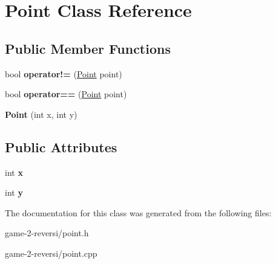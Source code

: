 \hypertarget{classPoint}{\section{Point Class Reference}
\label{classPoint}
}
\subsection*{Public Member Functions}
\begin{DoxyCompactItemize}
\item 
\hypertarget{classPoint_adcee15014d4b11143ecfc9afffe6a338}{bool {\bfseries operator!=} (\hyperlink{classPoint}{Point} point)}\label{classPoint_adcee15014d4b11143ecfc9afffe6a338}

\item 
\hypertarget{classPoint_ab5e7dc8e63dae82bc88456125b957482}{bool {\bfseries operator==} (\hyperlink{classPoint}{Point} point)}\label{classPoint_ab5e7dc8e63dae82bc88456125b957482}

\item 
\hypertarget{classPoint_a001c4958c310b248f5c26037aea38a9c}{{\bfseries Point} (int x, int y)}\label{classPoint_a001c4958c310b248f5c26037aea38a9c}

\end{DoxyCompactItemize}
\subsection*{Public Attributes}
\begin{DoxyCompactItemize}
\item 
\hypertarget{classPoint_a8c779e11e694b20e0946105a9f5de842}{int {\bfseries x}}\label{classPoint_a8c779e11e694b20e0946105a9f5de842}

\item 
\hypertarget{classPoint_a2e1b5fb2b2a83571f5c0bc0f66a73cf7}{int {\bfseries y}}\label{classPoint_a2e1b5fb2b2a83571f5c0bc0f66a73cf7}

\end{DoxyCompactItemize}


The documentation for this class was generated from the following files\-:\begin{DoxyCompactItemize}
\item 
game-\/2-\/reversi/point.\-h\item 
game-\/2-\/reversi/point.\-cpp\end{DoxyCompactItemize}
